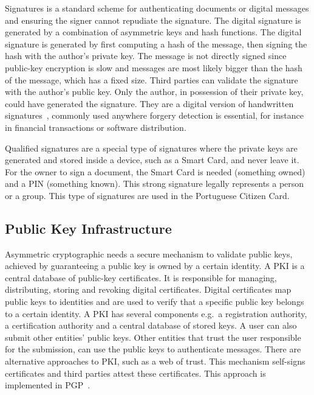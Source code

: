 Signatures is a standard scheme for authenticating documents or digital messages and ensuring the signer cannot repudiate the signature. The digital signature is generated by a combination of asymmetric keys and hash functions.
The digital signature is generated by first computing a hash of the message, then signing the hash with the author's private key. The message is not directly signed since public-key encryption is slow and messages are most likely bigger than the hash of the message, which has a fixed size. Third parties can validate the signature with the author's public key. Only the author, in possession of their private key, could have generated the signature.
They are a digital version of handwritten signatures~\cite{digitalsignatures}, commonly used anywhere forgery detection is essential, for instance in financial transactions or software distribution.

Qualified signatures are a special type of signatures where the private keys are generated and stored inside a device, such as a Smart Card, and never leave it. For the owner to sign a document, the Smart Card is needed (something owned) and a \ac{PIN} (something known). This strong signature legally represents a person or a group. This type of signatures are used in the Portuguese Citizen Card.

\subsection{Public Key Infrastructure}\label{chap:background:PKI}

Asymmetric cryptographic needs a secure mechanism to validate public keys, achieved by guaranteeing a public key is owned by a certain identity.
A \ac{PKI} is a central database of public-key certificates. It is responsible for managing, distributing, storing and revoking digital certificates. Digital certificates map public keys to identities and are used to verify that a specific public key belongs to a certain identity.
A \ac{PKI} has several components e.g.\ a registration authority, a certification authority and a central database of stored keys.
A user can also submit other entities' public keys. Other entities that trust the user responsible for the submission, can use the public keys to authenticate messages.
There are alternative approaches to \ac{PKI}, such as a web of trust. This mechanism self-signs certificates and third parties attest these certificates. This approach is implemented in \ac{PGP}~\cite{modelingPKI}.

